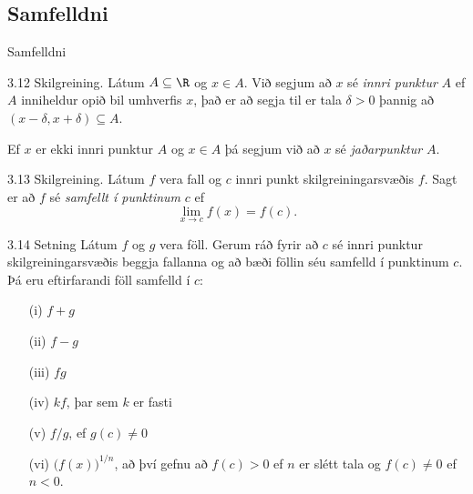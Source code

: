 \documentclass[icelandic,a4paper,12pt]{article}
\begin{document}
\subsection*{Samfelldni}

\begin{frame}{Samfelldni}
\pause
 \begin{block}{3.12 Skilgreining.}
Látum $A\subseteq \R$ og $x\in A$.  Við segjum að $x$ sé {\em innri
  punktur} $A$ ef $A$ inniheldur opið bil umhverfis $x$, það er að
segja til er tala $\delta>0$ þannig að $(x-\delta, x+\delta)\subseteq
A$. 

\pause

Ef $x$ er ekki innri punktur $A$ og $x\in A$ þá segjum við að $x$ sé
{\em jaðarpunktur} $A$.

\pause

\end{block}

\begin{block}{3.13 Skilgreining.}
Látum $f$ vera fall og $c$ innri punkt skilgreiningarsvæðis $f$.  Sagt
er að $f$ sé {\em samfellt í punktinum} $c$ ef
$$\lim_{x\rightarrow c}f(x)=f(c).$$
\end{block}
\end{frame}

\begin{frame}
 \begin{block}{3.14 Setning}
 Látum $f$ og $g$ vera föll.  Gerum ráð fyrir að $c$ sé innri punktur
skilgreiningarsvæðis beggja fallanna og að bæði föllin séu samfelld í
punktinum $c$.  Þá eru eftirfarandi föll samfelld í $c$:
\begin{itemize}
\pause
\item[(i)] $f+g$ %
\pause
\item[(ii)] $f-g$
\pause
\item[(iii)] $fg$
\pause
\item[(iv)] $kf$, þar sem $k$ er fasti
\pause
\item[(v)]  $f/g$, ef $g(c)\neq 0$
\pause
\item[(vi)]  $\Big(f(x)\Big)^{1/n}$, að því gefnu að 
$f(c)>0$ ef $n$ er slétt tala og $f(c)\neq 0$ ef $n<0$.
\end{itemize} 
\end{block}
\end{frame}
\end{document}
